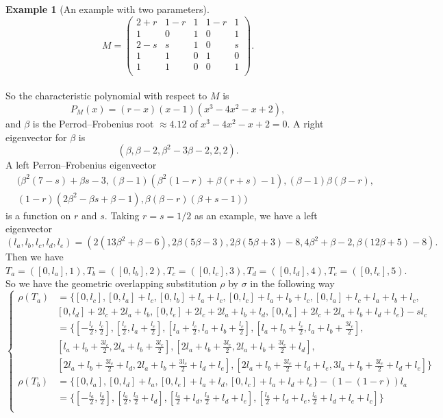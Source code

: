 \documentclass[a4]{amsart}
\theoremstyle{definition}
\newtheorem{ex}[theorem]{Example}
\begin{document}
\begin{ex}[An example with two parameters]
$$M=\left(\begin{matrix}
2+r& 1-r &1& 1-r & 1 \\
1&0&1& 0&1 \\
2-s&s& 1 & 0 & s \\
1& 1 &0 & 1&0 \\
1& 1 &0 & 0&1 \\
\end{matrix}
\right)
.$$\\
\medskip
So the characteristic polynomial with respect to $M$ is $$P_M(x)=(r - x) (x-1) (x^3- 4 x^2- x +2),$$
 and $\beta$ is the Perrod--Frobenius root $\approx 4.12$  of $x^3-4x^2-x+2=0$.  
A right eigenvector for $\beta$ is 
 $$(\beta,\beta-2,\beta^2-3 \beta-2,2,2).$$
A left Perron--Frobenius eigenvector 
\begin{align*}
&(\beta^2 (7-s)+\beta s-3,(\beta-1) \left(\beta^2
   (1-r)+\beta (r+s)-1\right),(\beta-1) \beta (\beta-r),\\
&(1-r)
   \left(2 \beta^2-\beta s+\beta-1\right),\beta (\beta-r) (\beta+s-1) )
\end{align*}
is a function on $r$ and $s$.
Taking $r=s=1/2$ as an example, we have 
a left eigenvector $$(l_a,l_b,l_c,l_d,l_e)=(2 \left(13 \beta^2+\beta-6\right),2 \beta (5 \beta-3),2 \beta(5 \beta+3)-8,4
   \beta^2+\beta-2,\beta (12 \beta+5)-8).$$
Then we have $T_a=([0,l_a],1), T_b=([0,l_b],2),T_c=([0,l_c],3),T_d=([0,l_d],4), T_e=([0,l_e],5).$
 So we have the geometric overlapping substitution $\rho$  by $\sigma$ in the following way
$$\left\{\begin{aligned}
\rho(T_a)&= \{[0,l_c],[0,l_a]+l_{c},[0,l_b]+l_a+l_c,[0,l_c]+l_a+l_b+l_c,[0,l_a]+l_c+l_a+l_b+l_c,\\
&[0,l_d]+2l_c+2l_a+l_b, [0,l_e]+2l_c+2l_a+l_b+l_d, [0,l_a]+2l_c+2l_a+l_b+l_d+l_e\}-sl_c\\
&= \{[-\frac{l_c}{2},\frac{l_c}{2}],[\frac{l_c}{2},l_a+\frac{l_c}{2}],[l_a+\frac{l_c}{2},l_a+l_b+\frac{l_c}{2}], [l_a+l_b+\frac{l_c}{2},l_a+l_b+\frac{3l_c}{2}],\\
&[l_a+l_b+\frac{3l_c}{2},2l_a+l_b+\frac{3l_c}{2}], [2l_a+l_b+\frac{3l_c}{2},2l_a+l_b+\frac{3l_c}{2}+l_d],\\
&[2l_a+l_b+\frac{3l_c}{2}+l_d,2l_a+l_b+\frac{3l_c}{2}+l_d+l_e], [2l_a+l_b+\frac{3l_c}{2}+l_d+l_e,3l_a+l_b+\frac{3l_c}{2}+l_d+l_e]\}\\
\rho(T_b)&=\{[0,l_a],[0,l_d]+l_a,[0,l_e]+l_a+l_d,[0,l_c]+l_a+l_d+l_e\}-(1-(1-r))l_a\\
&=\{[-\frac{l_a}{2},\frac{l_a}{2}],[\frac{l_a}{2},\frac{l_a}{2}+l_d],[\frac{l_a}{2}+l_d,\frac{l_a}{2}+l_d+l_e], [\frac{l_a}{2}+l_d+l_e,\frac{l_a}{2}+l_d+l_e+l_c]\}\\

\end{aligned}$$
\end{ex}
\end{document}
